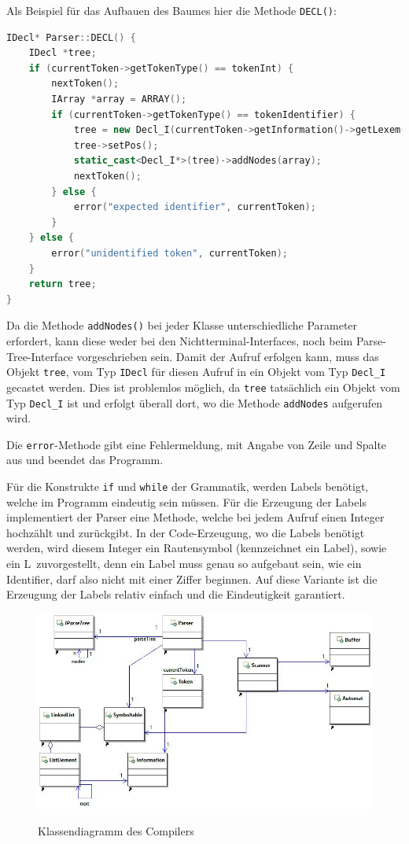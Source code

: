 \documentclass[listof=totoc,DIV11,a4paper]{scrreprt}
\begin{document}
Als Beispiel für das Aufbauen des Baumes hier die Methode \verb+DECL()+:

\begin{lstlisting}[language=C++,label=lst:decl,caption=Parser: Methode DECL()]
IDecl* Parser::DECL() {
    IDecl *tree;
    if (currentToken->getTokenType() == tokenInt) {
        nextToken();
        IArray *array = ARRAY();
        if (currentToken->getTokenType() == tokenIdentifier) {
            tree = new Decl_I(currentToken->getInformation()->getLexem());
            tree->setPos();
            static_cast<Decl_I*>(tree)->addNodes(array);
            nextToken();
        } else {
            error("expected identifier", currentToken);
        }
    } else {
        error("unidentified token", currentToken);
    }
    return tree;
}
\end{lstlisting}
Da die Methode \verb+addNodes()+ bei jeder Klasse unterschiedliche Parameter erfordert, kann diese weder bei den Nichtterminal-Interfaces, noch beim Parse-Tree-Interface vorgeschrieben sein. Damit der Aufruf erfolgen kann, muss das Objekt \verb+tree+, vom Typ \verb+IDecl+ für diesen Aufruf in ein Objekt vom Typ \verb+Decl_I+ gecastet werden. Dies ist problemlos möglich, da \verb+tree+ tatsächlich ein Objekt vom Typ \verb+Decl_I+ ist und erfolgt überall dort, wo die Methode \verb+addNodes+ aufgerufen wird.

Die \verb+error+-Methode gibt eine Fehlermeldung, mit Angabe von Zeile und Spalte aus und beendet das Programm.

Für die Konstrukte \verb+if+ und \verb+while+ der Grammatik, werden Labels benötigt, welche im Programm eindeutig sein müssen. Für die Erzeugung der Labels implementiert der Parser eine Methode, welche bei jedem Aufruf einen Integer hochzählt und zurückgibt. In der Code-Erzeugung, wo die Labels benötigt werden, wird diesem Integer ein Rautensymbol (kennzeichnet ein Label), sowie ein \glqq L\grqq\ zuvorgestellt, denn ein Label muss genau so aufgebaut sein, wie ein Identifier, darf also nicht mit einer Ziffer beginnen. Auf diese Variante ist die Erzeugung der Labels relativ einfach und die Eindeutigkeit garantiert.

\begin{figure}[b]
\includegraphics[width=\linewidth]{images/klassendia2}
\label{img:klassendia}
\caption{Klassendiagramm des Compilers}
\end{figure}
\end{document}
